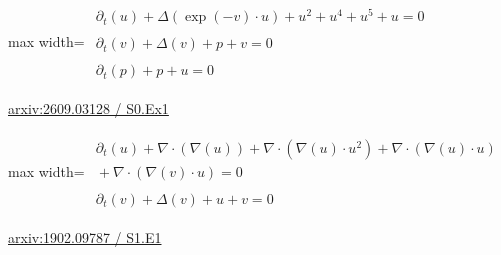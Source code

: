 \documentclass[UTF8,10pt,a4paper,fontset=mac]{ctexart}
\begin{document}
\begin{minipage}{\linewidth}\begin{center}\begin{adjustbox}{max width=\linewidth}$\displaystyle\begin{gathered}\begin{gathered}\partial_{t}(u)+\Delta(\exp(-v)\cdot u)+u^{2}+u^{4}+u^{5}+u=0\end{gathered}\\[5pt]\begin{gathered}\partial_{t}(v)+\Delta(v)+p+v=0\end{gathered}\\[5pt]\begin{gathered}\partial_{t}(p)+p+u=0\end{gathered}\end{gathered}$\end{adjustbox}\end{center}{\small\href{https://arxiv.org/html/2609.03128#S0.Ex1}{arxiv:2609.03128 / S0.Ex1}}\par\end{minipage}\par\vspace{6mm}

\begin{minipage}{\linewidth}\begin{center}\begin{adjustbox}{max width=\linewidth}$\displaystyle\begin{gathered}\begin{gathered}\partial_{t}(u)+\nabla\cdot(\nabla(u))+\nabla\cdot(\nabla(u)\cdot u^{2})+\nabla\cdot(\nabla(u)\cdot u)\\[-1pt]{}+\nabla\cdot(\nabla(v)\cdot u)=0\end{gathered}\\[5pt]\begin{gathered}\partial_{t}(v)+\Delta(v)+u+v=0\end{gathered}\end{gathered}$\end{adjustbox}\end{center}{\small\href{https://arxiv.org/html/1902.09787#S1.E1}{arxiv:1902.09787 / S1.E1}}\par\end{minipage}\par\vspace{6mm}
\end{document}
